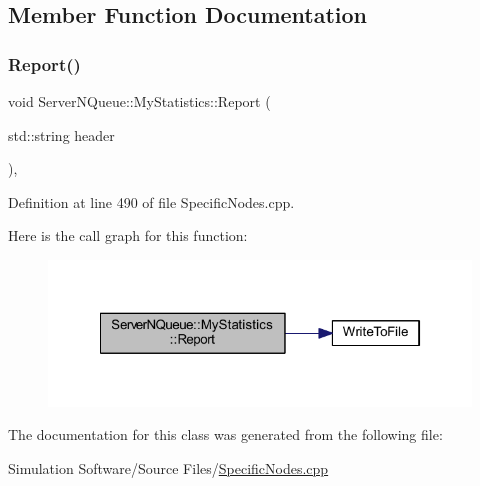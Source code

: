 \subsection{Member Function Documentation}
\mbox{\label{class_server_n_queue_1_1_my_statistics_ae070c508a1934a43cc167dd6a8917d86}} 
\subsubsection{\texorpdfstring{Report()}{Report()}}
{\footnotesize\ttfamily void Server\+N\+Queue\+::\+My\+Statistics\+::\+Report (\begin{DoxyParamCaption}\item[{std\+::string}]{header }\end{DoxyParamCaption})\hspace{0.3cm}{\ttfamily [inline]}, {\ttfamily [override]}}



Definition at line 490 of file Specific\+Nodes.\+cpp.

Here is the call graph for this function\+:
\nopagebreak
\begin{figure}[H]
\begin{center}
\leavevmode
\includegraphics[width=322pt]{class_server_n_queue_1_1_my_statistics_ae070c508a1934a43cc167dd6a8917d86_cgraph}
\end{center}
\end{figure}


The documentation for this class was generated from the following file\+:\begin{DoxyCompactItemize}
\item 
Simulation Software/\+Source Files/\hyperlink{_specific_nodes_8cpp}{Specific\+Nodes.\+cpp}\end{DoxyCompactItemize}
